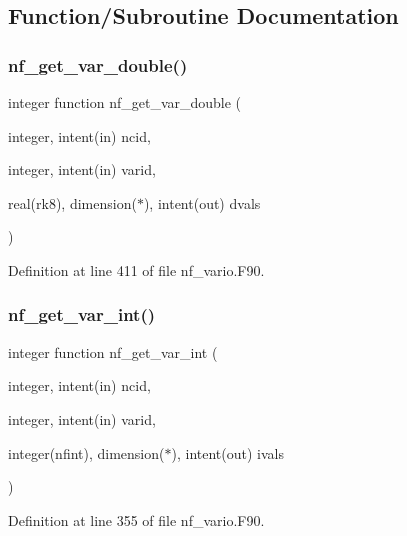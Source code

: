 \subsection{Function/\+Subroutine Documentation}
\mbox{\label{nf__vario_8F90_a15442abba3da75d4a3406f403b623a4e}} 
\subsubsection{\texorpdfstring{nf\+\_\+get\+\_\+var\+\_\+double()}{nf\_get\_var\_double()}}
{\footnotesize\ttfamily integer function nf\+\_\+get\+\_\+var\+\_\+double (\begin{DoxyParamCaption}\item[{integer, intent(in)}]{ncid,  }\item[{integer, intent(in)}]{varid,  }\item[{real(rk8), dimension($\ast$), intent(out)}]{dvals }\end{DoxyParamCaption})}



Definition at line 411 of file nf\+\_\+vario.\+F90.

\mbox{\label{nf__vario_8F90_aba37d2fec3b6f8fb25e43339250894f7}} 
\subsubsection{\texorpdfstring{nf\+\_\+get\+\_\+var\+\_\+int()}{nf\_get\_var\_int()}}
{\footnotesize\ttfamily integer function nf\+\_\+get\+\_\+var\+\_\+int (\begin{DoxyParamCaption}\item[{integer, intent(in)}]{ncid,  }\item[{integer, intent(in)}]{varid,  }\item[{integer(nfint), dimension($\ast$), intent(out)}]{ivals }\end{DoxyParamCaption})}



Definition at line 355 of file nf\+\_\+vario.\+F90.

